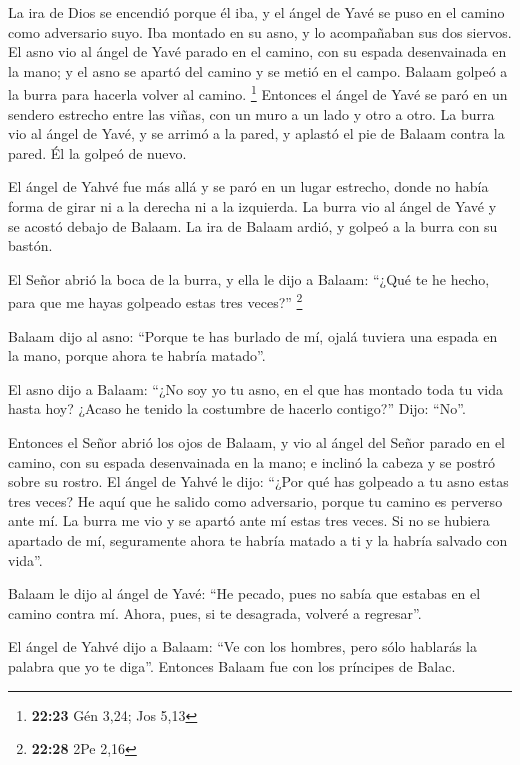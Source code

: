 \begin{paracol}{2}
 La ira de Dios se encendió porque él iba, y el ángel de
Yavé se puso en el camino como adversario suyo. Iba montado en su asno,
y lo acompañaban sus dos siervos.  El asno vio al ángel
de Yavé parado en el camino, con su espada desenvainada en la mano; y el
asno se apartó del camino y se metió en el campo. Balaam golpeó a la
burra para hacerla volver al camino. \footnote{\textbf{22:23} Gén 3,24;
  Jos 5,13}  Entonces el ángel de Yavé se paró en un
sendero estrecho entre las viñas, con un muro a un lado y otro a otro.
 La burra vio al ángel de Yavé, y se arrimó a la pared, y
aplastó el pie de Balaam contra la pared. Él la golpeó de nuevo.

 El ángel de Yahvé fue más allá y se paró en un lugar
estrecho, donde no había forma de girar ni a la derecha ni a la
izquierda.  La burra vio al ángel de Yavé y se acostó
debajo de Balaam. La ira de Balaam ardió, y golpeó a la burra con su
bastón.

 El Señor abrió la boca de la burra, y ella le dijo a
Balaam: ``¿Qué te he hecho, para que me hayas golpeado estas tres
veces?'' \footnote{\textbf{22:28} 2Pe 2,16}

 Balaam dijo al asno: ``Porque te has burlado de mí,
ojalá tuviera una espada en la mano, porque ahora te habría matado''.

 El asno dijo a Balaam: ``¿No soy yo tu asno, en el que
has montado toda tu vida hasta hoy? ¿Acaso he tenido la costumbre de
hacerlo contigo?'' Dijo: ``No''.

 Entonces el Señor abrió los ojos de Balaam, y vio al
ángel del Señor parado en el camino, con su espada desenvainada en la
mano; e inclinó la cabeza y se postró sobre su rostro. 
El ángel de Yahvé le dijo: ``¿Por qué has golpeado a tu asno estas tres
veces? He aquí que he salido como adversario, porque tu camino es
perverso ante mí.  La burra me vio y se apartó ante mí
estas tres veces. Si no se hubiera apartado de mí, seguramente ahora te
habría matado a ti y la habría salvado con vida''.

 Balaam le dijo al ángel de Yavé: ``He pecado, pues no
sabía que estabas en el camino contra mí. Ahora, pues, si te desagrada,
volveré a regresar''.

 El ángel de Yahvé dijo a Balaam: ``Ve con los hombres,
pero sólo hablarás la palabra que yo te diga''. Entonces Balaam fue con
los príncipes de Balac.


\end{paracol}
